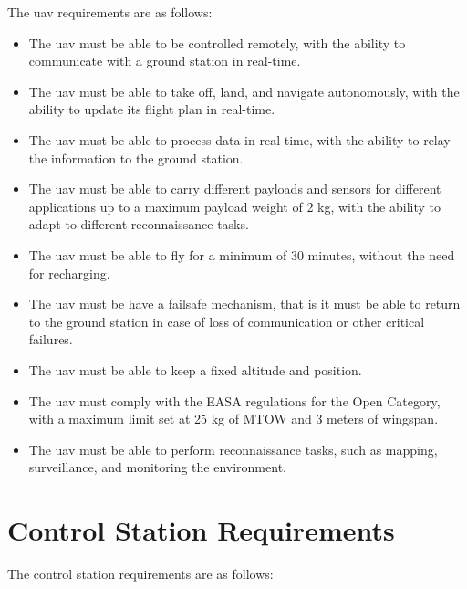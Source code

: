 The \gls{uav} requirements are as follows:

\begin{itemize}
  \item The \gls{uav} must be able to be controlled remotely, with the ability to communicate with a ground station in real-time.

  \item The \gls{uav} must be able to take off, land, and navigate autonomously, with the ability to update its flight plan in real-time.

  \item The \gls{uav} must be able to process data in real-time, with the ability to relay the information to the ground station.

  \item The \gls{uav} must be able to carry different payloads and sensors for different applications up to a maximum payload weight of 2 kg, with the ability to adapt to different reconnaissance tasks.

  \item The \gls{uav} must be able to fly for a minimum of 30 minutes, without the need for recharging.

  \item The \gls{uav} must be have a failsafe mechanism, that is it must be able to return to the ground station in case of loss of communication or other critical failures.

  \item The \gls{uav} must be able to keep a fixed altitude and position.

  \item The \gls{uav} must comply with the EASA regulations for the Open Category, with a maximum limit set at 25 kg of MTOW and 3 meters of wingspan.

  \item The \gls{uav} must be able to perform reconnaissance tasks, such as mapping, surveillance, and monitoring the environment.
\end{itemize}

\section{Control Station Requirements}

The control station requirements are as follows:


